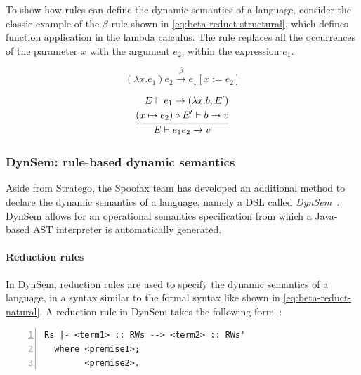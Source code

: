 To show how rules can define the dynamic semantics of a language, consider the
classic example of the \(\beta\)-rule shown in \cref{eq:beta-reduct-structural},
which defines function application in the lambda calculus. The rule replaces all
the occurrences of the parameter \(x\) with the argument \(e_2\), within the
expression \(e_1\).

\begin{equation}\label{eq:beta-reduct-structural}
(\lambda x.e_1) e_2 \xrightarrow{\beta} e_1[x := e_2]
\end{equation}

\begin{equation*}\label{eq:beta-reduct-natural}
\infer{%
  E \vdash e_1 e_2 \rightarrow v%
  }{%
    \begin{split}
      E \vdash e_1 \rightarrow (\lambda x.b, E') \\
      (x \mapsto e_2) \circ E' \vdash b \rightarrow v
    \end{split}%
}
\end{equation*}

\subsubsection{DynSem: rule-based dynamic semantics}
\label{ssec:dynsem}
Aside from Stratego, the Spoofax team has developed an additional
method to declare the dynamic semantics of a language, namely a DSL
called \emph{DynSem}~\cite{VerguNV15}. DynSem allows for an operational
semantics specification from which a Java-based AST interpreter is
automatically generated.

\paragraph{Reduction rules} In DynSem, reduction rules are used to specify the
dynamic semantics of a language, in a syntax similar to the formal syntax like
shown in \cref{eq:beta-reduct-natural}. A reduction rule in DynSem takes the
following form~\cite{VerguNV15}:

\begin{minipage}[t]{\linewidth}
\begin{lstlisting}[language=dynsem,numbers=left,caption={The syntactic structure
of a reduction rule in DynSem.},label={lst:dynsem-rule-syntax}]
  Rs |- <term1> :: RWs --> <term2> :: RWs'
  where <premise1>;
        <premise2>.
\end{lstlisting}
\end{minipage}

